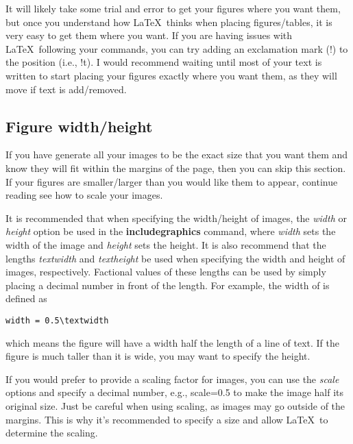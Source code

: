 It will likely take some trial and error to get your figures where you want them, but once you understand how \LaTeX\ thinks when placing figures/tables, it is very easy to get them where you want. If you are having issues with \LaTeX\ following your commands, you can try adding an exclamation mark (!) to the position (i.e., !t). I would recommend waiting until most of your text is written to start placing your figures exactly where you want them, as they will move if text is add/removed.

\subsection{Figure width/height}

If you have generate all your images to be the exact size that you want them and know they will fit within the margins of the page, then you can skip this section. If your figures are smaller/larger than you would like them to appear, continue reading see how to scale your images.

It is recommended that when specifying the width/height of images, the {\it width} or {\it height} option be used in the {\bf includegraphics} command, where {\it width} sets the width of the image and {\it height} sets the height. It is also recommend that the lengths {\it textwidth} and {\it textheight} be used when specifying the width and height of images, respectively. Factional values of these lengths can be used by simply placing a decimal number in front of the length. For example, the width of  is defined as
\begin{verbatim}width = 0.5\textwidth\end{verbatim}
which means the figure will have a width half the length of a line of text. If the figure is much taller than it is wide, you may want to specify the height.

If you would prefer to provide a scaling factor for images, you can use the {\it scale} options and specify a decimal number, e.g., scale=0.5 to make the image half its original size. Just be careful when using scaling, as images may go outside of the margins. This is why it's recommended to specify a size and allow \LaTeX\ to determine the scaling.

